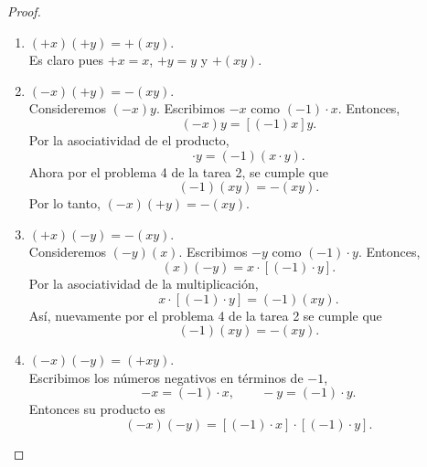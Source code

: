 \documentclass[12pt,a4paper]{article}
\begin{document}
    \begin{proof}
        \begin{enumerate}
            \item[(a)] $(+x)(+y)=+(xy)$.\\
            Es claro pues $+x=x$, $+y=y$ y $+(xy)$.
            \item[(b)] $(-x)(+y)=-(xy)$.\\
            Consideremos $(-x)y$. Escribimos $-x$ como $(-1)\cdot x$. Entonces,
            \begin{equation*}
                (-x)y=[(-1)x]y.
            \end{equation*}
            Por la asociatividad de el producto,
            \begin{equation*}
                [(-1)\cdot x]\cdot y=(-1)(x\cdot y).
            \end{equation*}
            Ahora por el problema 4 de la tarea 2, se cumple que
            \begin{equation*}
                (-1)(xy)=-(xy).
            \end{equation*}
            Por lo tanto, $(-x)(+y)=-(xy)$.
            \item[(c)] $(+x)(-y)=-(xy)$.\\
            Consideremos $(-y)(x)$. Escribimos $-y$ como $(-1)\cdot y$. Entonces,
            \begin{equation*}
                (x)(-y)=x\cdot[(-1)\cdot y].
            \end{equation*}
            Por la asociatividad de la multiplicación,
            \begin{equation*}
                x\cdot[(-1)\cdot y]=(-1)(xy).
            \end{equation*}
            Así, nuevamente por el problema 4 de la tarea 2 se cumple que
            \begin{equation*}
                (-1)(xy)=-(xy).
            \end{equation*}
            \item[(d)] $(-x)(-y)=(+xy)$.\\
            Escribimos los números negativos en términos de $-1$,
            \begin{equation*}
                -x=(-1)\cdot x,\qquad -y=(-1)\cdot y.
            \end{equation*}
            Entonces su producto es
            \begin{equation*}
                (-x)(-y)=[(-1)\cdot x]\cdot[(-1)\cdot y].

\end{equation*}
\end{enumerate}
\end{proof}
\end{document}
